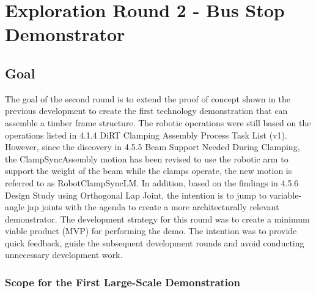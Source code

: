 \chapter{Exploration Round 2 - Bus Stop Demonstrator}
\label{chapter:exploration-round-2}

\section{Goal}
\label{section:exploration-2-goal}

The goal of the second round is to extend the proof of concept shown in the previous development to create the first technology demonstration that can assemble a timber frame structure. The robotic operations were still based on the operations listed in 4.1.4 DiRT Clamping Assembly Process Task List (v1). However, since the discovery in 4.5.5 Beam Support Needed During Clamping, the ClampSyncAssembly motion has been revised to use the robotic arm to support the weight of the beam while the clamps operate, the new motion is referred to as RobotClampSyncLM.
In addition, based on the findings in 4.5.6 Design Study using Orthogonal Lap Joint, the intention is to jump to variable-angle jap joints with the agenda to create a more architecturally relevant demonstrator. 
The development strategy for this round was to create a minimum viable product (MVP) for performing the demo. The intention was to provide quick feedback, guide the subsequent development rounds and avoid conducting unnecessary development work. 

\subsection{Scope for the First Large-Scale Demonstration}
\label{subsection:exploration-2-scope-for-the-first-large-scale-demonstration}

